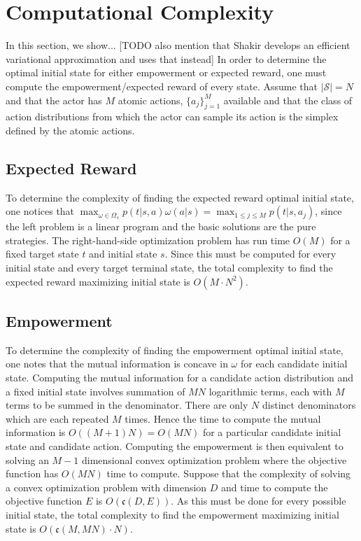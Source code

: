 \documentclass{article}
\newcommand{\Ss}{\mathcal{S}}
\begin{document}
\section{Computational Complexity}
In this section, we show... [TODO also mention that Shakir develops an efficient variational approximation and uses that instead]
In order to determine the optimal initial state for either empowerment or expected reward, one must compute the empowerment/expected reward of every state.
Assume that $|\Ss|=N$ and that the actor has $M$ atomic actions, $\{a_j\}_{j=1}^M$ available and that the class of action distributions from which the actor can sample its action is the simplex defined by the atomic actions. 

\subsection{Expected Reward}
To determine the complexity of finding the expected reward optimal initial state, one notices that $\max_{\omega\in\Omega_s} p(t|s,a)\omega(a|s) = \max_{1\leq j \leq M} p(t|s,a_j)$, since the left problem is a linear program and the basic solutions are the pure strategies.
The right-hand-side optimization problem has run time $O(M)$ for a fixed target state $t$ and initial state $s$. Since this must be computed for every initial state and every target terminal state, the total complexity to find the expected reward maximizing initial state is $O(M\cdot N^2)$. 

\subsection{Empowerment}
To determine the complexity of finding the empowerment optimal initial state, one notes that the mutual information is concave \cite{braverman2011information} in $\omega$ for each candidate initial state. Computing the mutual information for a candidate action distribution and a fixed initial state involves summation of $MN$ logarithmic terms, each with $M$ terms to be summed in the denominator. There are only $N$ distinct denominators which are each repeated $M$ times. Hence the time to compute the mutual information is $O((M+1)N)=O(MN)$ for a particular candidate initial state and candidate action. Computing the empowerment is then equivalent to solving an $M-1$ dimensional convex optimization problem where the objective function has $O(MN)$ time to compute.  Suppose that the complexity of solving a convex optimization problem with dimension $D$ and time to compute the objective function $E$ is $O(\mathfrak{c}(D,E))$. As this must be done for every possible initial state, the total complexity to find the empowerment maximizing initial state is $O(\mathfrak{c}(M,MN)\cdot N)$. 
\end{document}
